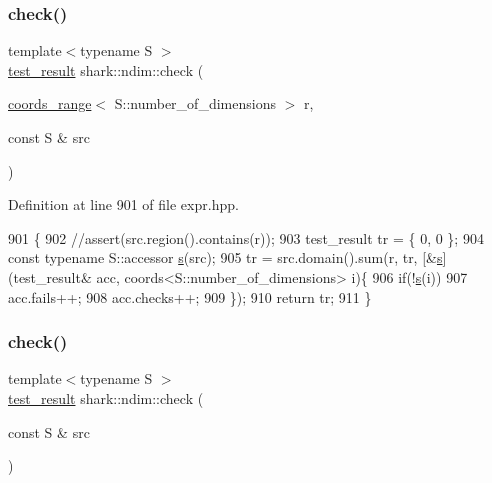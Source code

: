 \subsubsection{\texorpdfstring{check()}{check()}\hspace{0.1cm}{\footnotesize\ttfamily [1/2]}}
{\footnotesize\ttfamily template$<$typename S $>$ \\
\hyperlink{structshark_1_1test__result}{test\+\_\+result} shark\+::ndim\+::check (\begin{DoxyParamCaption}\item[{\hyperlink{structshark_1_1ndim_1_1coords__range}{coords\+\_\+range}$<$ S\+::number\+\_\+of\+\_\+dimensions $>$}]{r,  }\item[{const S \&}]{src }\end{DoxyParamCaption})}



Definition at line 901 of file expr.\+hpp.


\begin{DoxyCode}
901                                                                                \{
902             \textcolor{comment}{//assert(src.region().contains(r));}
903             test\_result tr = \{ 0, 0 \};
904             \textcolor{keyword}{const} \textcolor{keyword}{typename} S::accessor \hyperlink{classshark_1_1_group_a6c59f34c15be2873372cd006c2939da2}{s}(src);
905             tr = src.domain().sum(r, tr, [&\hyperlink{classshark_1_1_group_a6c59f34c15be2873372cd006c2939da2}{s}](test\_result& acc, coords<S::number\_of\_dimensions> i)\{
906                 \textcolor{keywordflow}{if}(!\hyperlink{classshark_1_1_group_a6c59f34c15be2873372cd006c2939da2}{s}(i))
907                     acc.fails++;
908                 acc.checks++;
909             \});
910             \textcolor{keywordflow}{return} tr;
911         \}
\end{DoxyCode}
\hypertarget{namespaceshark_1_1ndim_ac4c2c304de61ac4b22c8b266c1627db8}{}\label{namespaceshark_1_1ndim_ac4c2c304de61ac4b22c8b266c1627db8} 
\subsubsection{\texorpdfstring{check()}{check()}\hspace{0.1cm}{\footnotesize\ttfamily [2/2]}}
{\footnotesize\ttfamily template$<$typename S $>$ \\
\hyperlink{structshark_1_1test__result}{test\+\_\+result} shark\+::ndim\+::check (\begin{DoxyParamCaption}\item[{const S \&}]{src }\end{DoxyParamCaption})}



